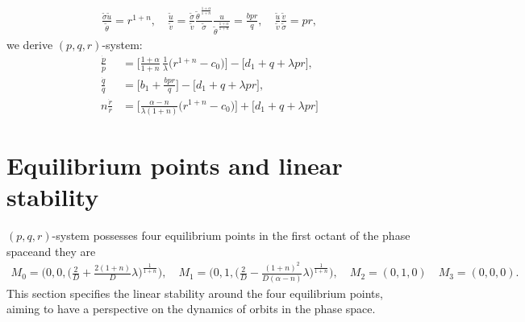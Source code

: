 \documentclass[a4paper,11pt]{article}
\def\tv{{\tilde{v}}}
\def\tth{{\tilde{\theta}}}
\def\ts{{\tilde{\sigma}}}
\def\tu{{\tilde{u}}}
\def\dpp{\dot{p}}
\def\dqq{\dot{q}}
\def\drr{\dot{r}}
\begin{document}
\begin{align*}
 \frac{\ts\tu}{\tth} = r^{1+n}, \quad \frac{\tu}{\tv} = \frac{\ts}{\tv} \frac{\tth^{\,\frac{1+\alpha}{1+n}}}{\ts} \frac{u}{\tth^{\,\frac{1+\alpha}{1+n}}} = \frac{bpr}{q}, \quad \frac{\tu}{\tv} \frac{\tv}{\ts} = pr,
\end{align*}
we derive $(p,q,r)$-system:
\begin{equation} \label{eq:pqrsys}
\begin{aligned}
 \frac{\dpp}{p}&=\Big[\frac{1+\alpha}{1+n}\,\frac{1}{\lambda }\Big(r^{1+n}-c_0\Big)\Big] -\Big[d_1 + q + \lambda pr\Big],\\
 \frac{\dqq}{q}&=\Big[b_1 +\frac{bpr}{q}\Big] -\Big[d_1 + q + \lambda pr\Big],\\
 n\frac{\drr}{r}&=\Big[\frac{\alpha-n}{\lambda(1+n)}\Big(r^{1+n}-c_0\Big)\Big]+\Big[d_1 + q + \lambda pr\Big]
\end{aligned}
\end{equation}
\section{Equilibrium points and linear stability} \label{sec:equil}
$(p,q,r)$-system possesses four equilibrium points in the first octant of the phase space\footnotemark[1] and they are
\begin{align*}
 M_0=\Big(0,0,\big(\frac{2}{D} + \frac{2(1+n)}{D} \lambda\big)^{\frac{1}{1+n}}\Big), \quad M_1=\Big(0,1,\big(\frac{2}{D} -\frac{(1+n)^2}{D(\alpha-n)} \lambda\big)^{\frac{1}{1+n}}\Big), \quad  M_2=(0,1,0) \quad M_3 = (0,0,0).
\end{align*}
This section specifies the linear stability around the four equilibrium points, aiming to have a perspective on the dynamics of orbits in the phase space.
\end{document}
